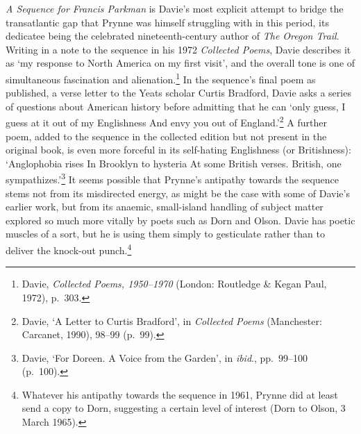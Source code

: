 \documentclass[]{article}
\begin{document}
\emph{A Sequence for Francis Parkman} is Davie’s most explicit attempt
to bridge the transatlantic gap that Prynne was himself struggling with
in this period, its dedicatee being the celebrated nineteenth-century
author of \emph{The Oregon Trail}. Writing in a note to the sequence in
his 1972 \emph{Collected Poems}, Davie describes it as ‘my response to
North America on my first visit’, and the overall tone is one of
simultaneous fascination and alienation.\footnote{Davie, \emph{Collected
  Poems, 1950–1970} (London: Routledge \& Kegan Paul, 1972), p.~303.} In
the sequence’s final poem as published, a verse letter to the Yeats
scholar Curtis Bradford, Davie asks a series of questions about American
history before admitting that he can ‘only guess, \textbar{} I guess at
it out of my Englishness \textbar{} And envy you out of
England.’\footnote{Davie, ‘A Letter to Curtis Bradford’, in
  \emph{Collected Poems} (Manchester: Carcanet, 1990), 98–99 (p.~99).} A
further poem, added to the sequence in the collected edition but not
present in the original book, is even more forceful in its self-hating
Englishness (or Britishness): ‘Anglophobia rises \textbar{} In Brooklyn
to hysteria \textbar{} At some British verses. \textbar{} British, one
sympathizes.’\footnote{Davie, ‘For Doreen. A Voice from the Garden’, in
  \emph{ibid}., pp.~99–100 (p.~100).} It seems possible that Prynne’s
antipathy towards the sequence stems not from its misdirected energy, as
might be the case with some of Davie’s earlier work, but from its
anaemic, small-island handling of subject matter explored so much more
vitally by poets such as Dorn and Olson. Davie has poetic muscles of a
sort, but he is using them simply to gesticulate rather than to deliver
the knock-out punch.\footnote{Whatever his antipathy towards the
  sequence in 1961, Prynne did at least send a copy to Dorn, suggesting
  a certain level of interest (Dorn to Olson, 3 March 1965).}
\end{document}
